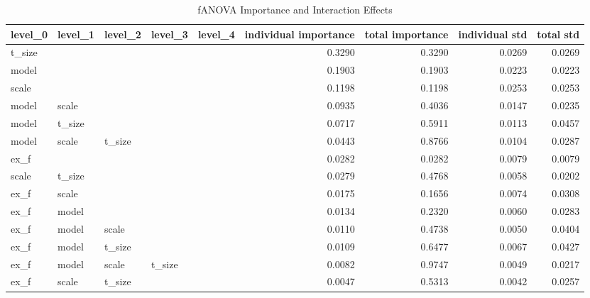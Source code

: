 \begin{table}
\centering
\caption{fANOVA Importance and Interaction Effects}
\label{tab:fanova_importance_ngf}
\begin{tabular}{lllllrrrr}
\toprule
level\_0 & level\_1 & level\_2 & level\_3 & level\_4 & individual importance & total importance & individual std & total std \\
\midrule
 t\_size &         &         &         &         &                0.3290 &           0.3290 &         0.0269 &    0.0269 \\
  model &         &         &         &         &                0.1903 &           0.1903 &         0.0223 &    0.0223 \\
  scale &         &         &         &         &                0.1198 &           0.1198 &         0.0253 &    0.0253 \\
  model &   scale &         &         &         &                0.0935 &           0.4036 &         0.0147 &    0.0235 \\
  model &  t\_size &         &         &         &                0.0717 &           0.5911 &         0.0113 &    0.0457 \\
  model &   scale &  t\_size &         &         &                0.0443 &           0.8766 &         0.0104 &    0.0287 \\
   ex\_f &         &         &         &         &                0.0282 &           0.0282 &         0.0079 &    0.0079 \\
  scale &  t\_size &         &         &         &                0.0279 &           0.4768 &         0.0058 &    0.0202 \\
   ex\_f &   scale &         &         &         &                0.0175 &           0.1656 &         0.0074 &    0.0308 \\
   ex\_f &   model &         &         &         &                0.0134 &           0.2320 &         0.0060 &    0.0283 \\
   ex\_f &   model &   scale &         &         &                0.0110 &           0.4738 &         0.0050 &    0.0404 \\
   ex\_f &   model &  t\_size &         &         &                0.0109 &           0.6477 &         0.0067 &    0.0427 \\
   ex\_f &   model &   scale &  t\_size &         &                0.0082 &           0.9747 &         0.0049 &    0.0217 \\
   ex\_f &   scale &  t\_size &         &         &                0.0047 &           0.5313 &         0.0042 &    0.0257 \\

\end{tabular}
\end{table}
